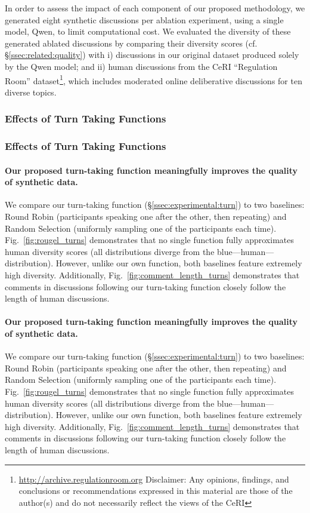 In order to assess the impact of each component of our proposed methodology, we generated eight synthetic discussions per ablation experiment, using a single model, Qwen, to limit computational cost. We evaluated the diversity of these generated ablated discussions by comparing their diversity scores (cf. \S\ref{ssec:related:quality}) with i) discussions in our original dataset produced solely by the Qwen model; and ii) human discussions from the \ac{CeRI} “Regulation Room” dataset\footnote{\url{http://archive.regulationroom.org} Disclaimer: Any opinions, findings, and conclusions or recommendations expressed in this material are those of the author(s) and do not necessarily reflect the views of the \ac{CeRI}}, which includes moderated online deliberative discussions for ten diverse topics.


\subsubsection{Effects of Turn Taking Functions}
\subsubsection{Effects of Turn Taking Functions}

\paragraph{Our proposed turn-taking function meaningfully improves the quality of synthetic data.} We compare our turn-taking function (\S\ref{ssec:experimental:turn}) to two baselines: Round Robin (participants speaking one after the other, then repeating) and Random Selection (uniformly sampling one of the participants each time). Fig.~\ref{fig:rougel_turns} demonstrates that no single function fully approximates human diversity scores (all distributions diverge from the blue—human—distribution). However, unlike our own function, both baselines feature extremely high diversity. Additionally, Fig.~\ref{fig:comment_length_turns} demonstrates that comments in discussions following our turn-taking function closely follow the length of human discussions. %
\paragraph{Our proposed turn-taking function meaningfully improves the quality of synthetic data.} We compare our turn-taking function (\S\ref{ssec:experimental:turn}) to two baselines: Round Robin (participants speaking one after the other, then repeating) and Random Selection (uniformly sampling one of the participants each time). Fig.~\ref{fig:rougel_turns} demonstrates that no single function fully approximates human diversity scores (all distributions diverge from the blue—human—distribution). However, unlike our own function, both baselines feature extremely high diversity. Additionally, Fig.~\ref{fig:comment_length_turns} demonstrates that comments in discussions following our turn-taking function closely follow the length of human discussions. %


